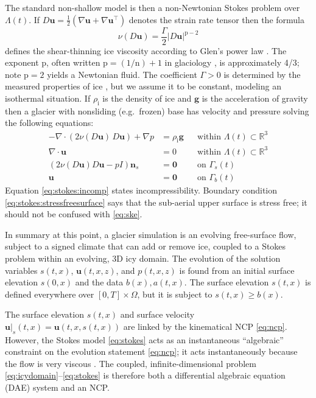 \documentclass[hidelinks,onefignum,onetabnum,final]{siamart220329}  %
\newcommand{\RR}{\mathbb{R}}
\newcommand{\grad}{\nabla}
\newcommand{\bg}{\mathbf{g}}
\newcommand{\bn}{\mathbf{n}}
\newcommand{\bu}{\mathbf{u}}
\newcommand{\bzero}{\bm{0}}
\newcommand{\nn}{{\text{n}}}
\newcommand{\pp}{{\text{p}}}
\newcommand{\rhoi}{\rho_{\text{i}}}
\begin{document}
The standard non-shallow model is then a non-Newtonian Stokes problem \cite{GreveBlatter2009,JouvetRappaz2011,SchoofHewitt2013} over $\Lambda(t)$.  If $D\bu=\frac{1}{2}(\grad \bu + \grad \bu^{\top})$ denotes the strain rate tensor then the formula
\begin{equation}
\nu(D\bu) = \frac{\Gamma}{2} |D\bu|^{\pp-2} \label{eq:glen}
\end{equation}
defines the shear-thinning ice viscosity according to Glen's power law \cite{GreveBlatter2009}.  The exponent $\pp$, often written $\pp=(1/\nn)+1$ in glaciology \cite{GoldsbyKohlstedt2001}, is approximately 4/3; note $\pp=2$ yields a Newtonian fluid.  The coefficient $\Gamma>0$ is determined by the measured properties of ice \cite{GoldsbyKohlstedt2001,GreveBlatter2009}, but we assume it to be constant, modeling an isothermal situation.  If $\rhoi$ is the density of ice and $\bg$ is the acceleration of gravity then a glacier with nonsliding (e.g.~frozen) base \cite{JouvetRappaz2011} has velocity and pressure solving the following equations:
\begin{subequations}
\label{eq:stokes}
\begin{align}
- \nabla \cdot \left(2 \nu(D\bu)\, D\bu\right) + \nabla p &= \rhoi \bg && \text{within $\Lambda(t) \subset \RR^3$} \\
\nabla \cdot \bu &= 0 && \text{within $\Lambda(t) \subset \RR^3$} \label{eq:stokes:incomp} \\
\left(2 \nu(D\bu) D\bu - pI\right) \bn_s &= \bzero && \text{on $\Gamma_s(t)$}\label{eq:stokes:stressfreesurface} \\
\bu  &= \bzero && \text{on $\Gamma_b(t)$}
\end{align}
\end{subequations}
Equation \eqref{eq:stokes:incomp} states incompressibility.  Boundary condition \eqref{eq:stokes:stressfreesurface} says that the sub-aerial upper surface is stress free; it should not be confused with \eqref{eq:ske}.

In summary at this point, a glacier simulation is an evolving free-surface flow, subject to a signed climate that can add or remove ice, coupled to a Stokes problem within an evolving, 3D icy domain.  The evolution of the solution variables $s(t,x)$, $\bu(t,x,z)$, and $p(t,x,z)$ is found from an initial surface elevation $s(0,x)$ and the data $b(x),a(t,x)$.  The surface elevation $s(t,x)$ is defined everywhere over $[0,T]\times \Omega$, but it is subject to $s(t,x) \ge b(x)$.

The surface elevation $s(t,x)$ and surface velocity $\bu|_s(t,x)=\bu(t,x,s(t,x))$ are linked by the kinematical NCP \eqref{eq:ncp}.  However, the Stokes model \eqref{eq:stokes} acts as an instantaneous ``algebraic'' constraint on the evolution statement \eqref{eq:ncp}; it acts instantaneously because the flow is very viscous \cite{Acheson1990}.  The coupled, infinite-dimensional problem \eqref{eq:icydomain}--\eqref{eq:stokes} is therefore both a differential algebraic equation (DAE) system \cite{AscherPetzold1998} and an NCP.
\end{document}
